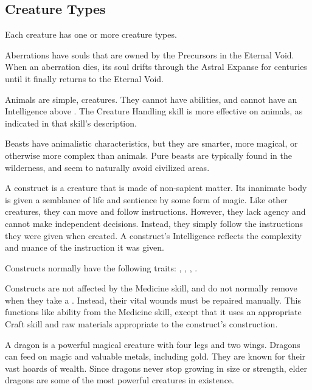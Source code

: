 \subsection{Creature Types}\label{Creature Types}

  Each creature has one or more creature types.

  Aberrations have souls that are owned by the Precursors in the Eternal Void.
  When an aberration dies, its soul drifts through the Astral Expanse for centuries until it finally returns to the Eternal Void.

  Animals are simple,  creatures.
  They cannot have \magical abilities, and cannot have an Intelligence above .
  The Creature Handling skill is more effective on animals, as indicated in that skill's description.

  Beasts have animalistic characteristics, but they are smarter, more magical, or otherwise more complex than animals.
  Pure beasts are typically found in the wilderness, and seem to naturally avoid civilized areas.

   A construct is a creature that is made of non-sapient matter.
  Its inanimate body is given a semblance of life and sentience by some form of magic.
  Like other creatures, they can move and follow instructions.
  However, they lack agency and cannot make independent decisions.
  Instead, they simply follow the instructions they were given when created.
  A construct's Intelligence reflects the complexity and nuance of the instruction it was given.

  Constructs normally have the following traits: , , , .

  Constructs are not affected by the Medicine skill, and do not normally remove  when they take a .
  Instead, their vital wounds must be repaired manually.
  This functions like  ability from the Medicine skill, except that it uses an appropriate Craft skill and raw materials appropriate to the construct's construction.

   A dragon is a powerful magical creature with four legs and two wings.
  Dragons can feed on magic and valuable metals, including gold. 
  They are known for their vast hoards of wealth.
  Since dragons never stop growing in size or strength, elder dragons are some of the most powerful creatures in existence.

